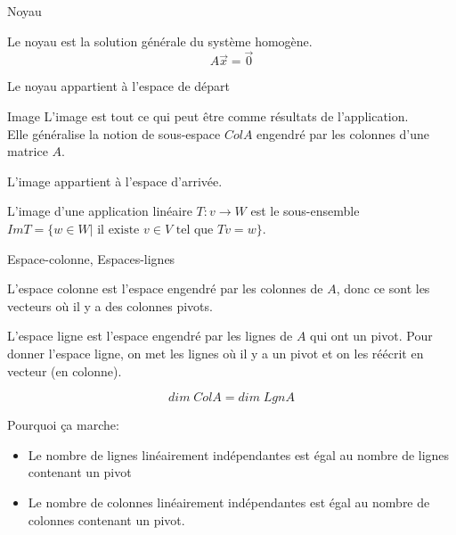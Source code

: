 \begin{parag}{Noyau}
    \begin{truc}
        Le noyau est la solution générale du système homogène.
        \[A\vec{x} = \vec{0} \]
    \end{truc}
    \begin{truc}
        Le noyau appartient à l'espace de départ 
    \end{truc}
\end{parag}
    
\begin{parag}{Image}
    L'image est tout ce qui peut être comme résultats de l'application.\\
    Elle généralise la notion de sous-espace $ColA$ engendré par les colonnes d'une matrice $A$.
    \begin{truc}
        L'image appartient à l'espace d'arrivée.
    \end{truc}
    \begin{truc}
        L'image d'une application linéaire $T: v \to W$ est le sous-ensemble $ImT = \{ w \in W| \text{ il existe } v \in V \text{ tel que } Tv = w\}$.
    \end{truc}
    
\end{parag}

\begin{parag}{Espace-colonne, Espaces-lignes}
    \begin{truc}
        L'espace colonne est l'espace engendré par les colonnes de $A$, donc ce sont les vecteurs où il y a des colonnes pivots.
    \end{truc}
    \begin{truc}
        L'espace ligne est l'espace engendré par les lignes de $A$ qui ont un pivot. Pour donner l'espace ligne, on met les lignes où il y a un pivot et on les réécrit en vecteur (en colonne).
    \end{truc}
    \begin{truc}
        \[dim\; ColA = dim\; LgnA\]
    \end{truc}
    Pourquoi ça marche:
    \begin{itemize}
        \item Le nombre de lignes linéairement indépendantes est égal au nombre de lignes contenant un pivot
        \item Le nombre de colonnes linéairement indépendantes est égal au nombre de colonnes contenant un pivot.
    \end{itemize}
\end{parag}

